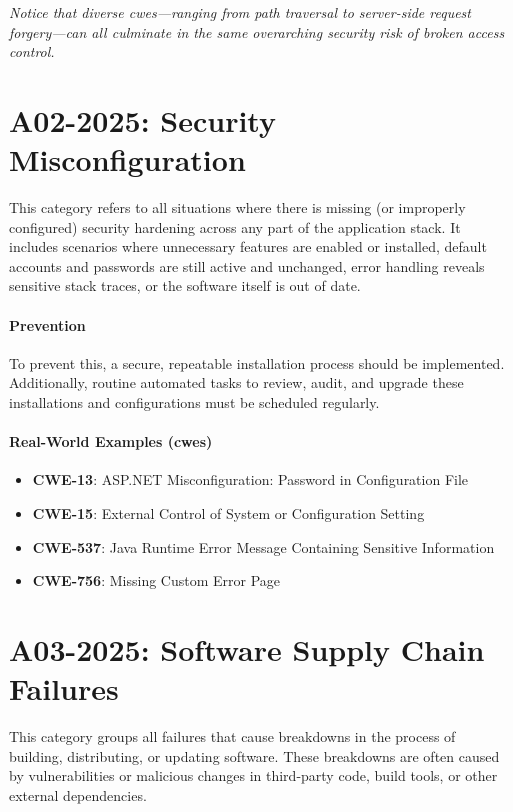\noindent \textit{Notice that diverse \glspl{cwe}—ranging from path traversal to server-side request forgery—can all culminate in the same overarching security risk of broken access control.}

\section{A02-2025: Security Misconfiguration}
This category refers to all situations where there is missing (or improperly configured) security hardening across any part of the application stack. It includes scenarios where unnecessary features are enabled or installed, default accounts and passwords are still active and unchanged, error handling reveals sensitive stack traces, or the software itself is out of date.

\paragraph{Prevention} To prevent this, a secure, repeatable installation process should be implemented. Additionally, routine automated tasks to review, audit, and upgrade these installations and configurations must be scheduled regularly.

\paragraph{Real-World Examples (\glspl{cwe})}
\begin{itemize}
    \item \textbf{CWE-13}: ASP.NET Misconfiguration: Password in Configuration File
    \item \textbf{CWE-15}: External Control of System or Configuration Setting
    \item \textbf{CWE-537}: Java Runtime Error Message Containing Sensitive Information
    \item \textbf{CWE-756}: Missing Custom Error Page
\end{itemize}

\section{A03-2025: Software Supply Chain Failures}
This category groups all failures that cause breakdowns in the process of building, distributing, or updating software. These breakdowns are often caused by vulnerabilities or malicious changes in third-party code, build tools, or other external dependencies.

